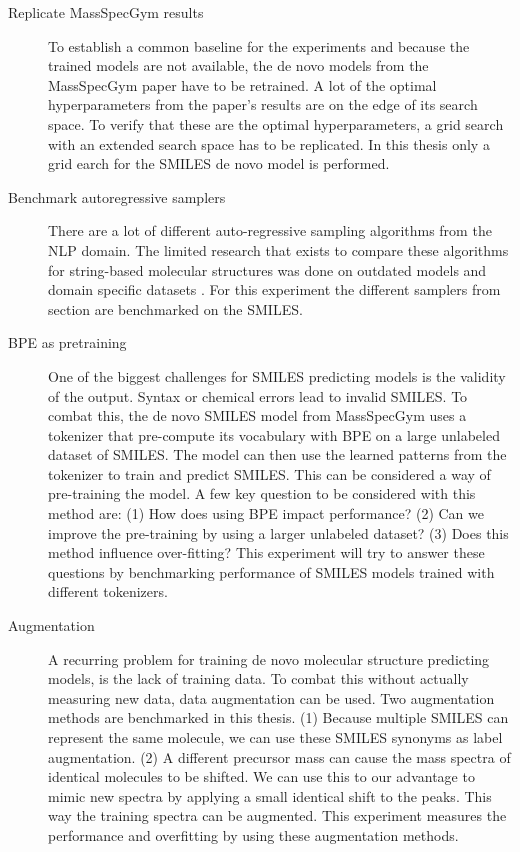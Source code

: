 \begin{description}
    \item[Replicate MassSpecGym results]
    To establish a common baseline for the experiments and because the trained models are not available, the de novo models from the MassSpecGym paper \cite{bushuiev2024massspecgym} have to be retrained.
    A lot of the optimal hyperparameters from the paper's results are on the edge of its search space.
    To verify that these are the optimal hyperparameters, a grid search with an extended search space has to be replicated.
    In this thesis only a grid earch for the SMILES de novo model is performed.
    
    \item[Benchmark autoregressive samplers]
    There are a lot of different auto-regressive sampling algorithms from the \ac{NLP} domain.
    The limited research that exists to compare these algorithms for string-based molecular structures was done on outdated models and domain specific datasets \cite{stravs2022msnovelist}.
    For this experiment the different samplers from section \label{sec:samplingmethods} are benchmarked on the SMILES.
    
    \item[\acf{BPE} as pretraining]
    One of the biggest challenges for SMILES predicting models is the validity of the output. Syntax or chemical errors lead to invalid SMILES.
    To combat this, the de novo SMILES model from MassSpecGym uses a tokenizer that pre-compute its vocabulary with \ac{BPE} on a large unlabeled dataset of SMILES.
    The model can then use the learned patterns from the tokenizer to train and predict SMILES.
    This can be considered a way of pre-training the model.
    A few key question to be considered with this method are: 
    (1) How does using \ac{BPE} impact performance?
    (2) Can we improve the pre-training by using a larger unlabeled dataset?
    (3) Does this method influence over-fitting?
    This experiment will try to answer these questions by benchmarking performance of SMILES models trained with different tokenizers.

    \item[Augmentation]
    A recurring problem for training de novo molecular structure predicting models, is the lack of training data.
    To combat this without actually measuring new data, data augmentation can be used. 
    Two augmentation methods are benchmarked in this thesis.
    (1) Because multiple SMILES can represent the same molecule, we can use these SMILES synonyms as label augmentation.
    (2) A different precursor mass can cause the mass spectra of identical molecules to be shifted.
    We can use this to our advantage to mimic new spectra by applying a small identical shift to the peaks.
    This way the training spectra can be augmented.
    This experiment measures the performance and overfitting by using these augmentation methods.


\end{description}
